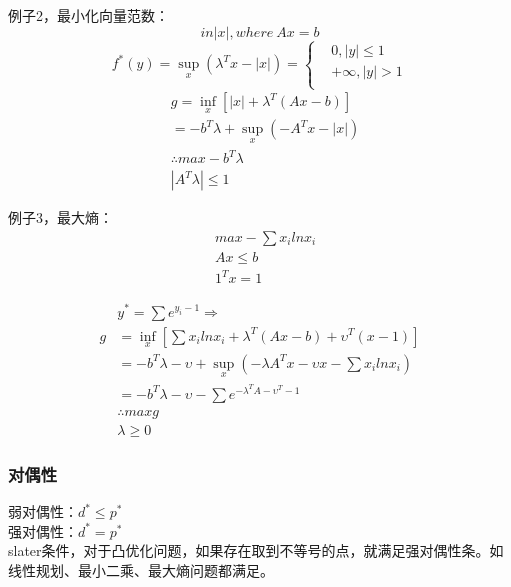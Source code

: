 \documentclass[UTF8]{../computerUniverse}
\begin{document}
例子2，最小化向量范数：
\begin{equation}
 in|x|, where \ Ax=b
\end{equation}
\begin{equation}
 f^*(y)=\sup_x \left( \lambda^Tx-|x| \right)=\left\{  
  \begin{aligned}
     &0,|y|\leqslant 1\\
    &+\infty,|y|>1\\
  \end{aligned} \right.
\end{equation}
\begin{equation}
    \begin{split}
    &g=\inf_x \left[ |x|+\lambda^T(Ax-b) \right]\\
    &=-b^T\lambda+\sup_x \left( -A^Tx-|x| \right)\\
    & \therefore max -b^T\lambda\\
    & |A^T\lambda|\leqslant1
    \end{split}
\end{equation}
  
例子3，最大熵：
\begin{equation}
\begin{split}
&max -\sum x_ilnx_i\\
&Ax\leqslant b\\
&1^Tx=1
\end{split}
\end{equation}

\begin{equation}
\begin{split}
&y^*=\sum e^{y_i-1} \Rightarrow\\
g&=\inf_x \left[ \sum x_ilnx_i+\lambda^T(Ax-b)+\upsilon^T(x-1) \right]\\
&=-b^T\lambda-\upsilon+\sup_x \left( -\lambda A^Tx-\upsilon x-\sum x_ilnx_i \right)\\
&=-b^T\lambda -\upsilon-\sum e^{-\lambda^TA-\upsilon^T-1}\\
&\therefore max g \\
&\lambda \geqslant 0
\end{split}
\end{equation}
 
\subsubsection{对偶性}
弱对偶性：$d^*\leqslant p^*$\\
强对偶性：$d^* = p^*$\\
slater条件，对于凸优化问题，如果存在取到不等号的点，就满足强对偶性条。如线性规划、最小二乘、最大熵问题都满足。
\end{document}
